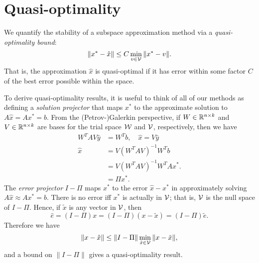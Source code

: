 \documentclass[12pt, leqno]{article} %
\begin{document}

\section{Quasi-optimality}

We quantify the stability of a subspace approximation method via
a {\em quasi-optimality bound}:
\[
  \|x^*-\hat{x}\| \leq C \min_{v \in \mathcal{V}} \|x^*-v\|.
\]
That is, the approximation $\hat{x}$ is quasi-optimal if it has
error within some factor $C$ of the best error possible within the
space.

To derive quasi-optimality results, it is useful to think of all
of our methods as defining a {\em solution projector}
that maps $x^*$ to the approximate solution to $A\hat{x} = Ax^* = b$.
From the (Petrov-)Galerkin perspective, if $W \in \mathbb{R}^{n \times k}$
and $V \in \mathbb{R}^{n \times k}$ are bases for the trial space $\mathcal{W}$
and $\mathcal{V}$, respectively, then we have
\begin{align*}
  W^T A V \hat{y} &= W^T b, \quad \hat{x} = V \hat{y} \\
  \hat{x} &= V (W^T A V)^{-1} W^T b \\
          &= V (W^T A V)^{-1} W^T A x^*. \\
          &= \Pi x^*.
\end{align*}
The {\em error projector} $I-\Pi$ maps $x^*$ to the error $\hat{x}-x^*$
in approximately solving $A\hat{x} \approx Ax^* = b$.  There is no
error iff $x^*$ is actually in $\mathcal{V}$; that is, $\mathcal{V}$ is the
null space of $I-\Pi$.  Hence, if $\tilde{x}$ is any vector in $\mathcal{V}$,
then
\[
  \hat{e} = (I-\Pi) x = (I-\Pi) (x-\tilde{x}) = (I-\Pi) \tilde{e}.
\]
Therefore we have
\[
  \|x-\hat{x}\| \leq \|I-\Pi\| \min_{\tilde{x} \in \mathcal{V}} \|x-\tilde{x}\|,
\]
and a bound on $\|I-\Pi\|$ gives a quasi-optimality result.
\end{document}
